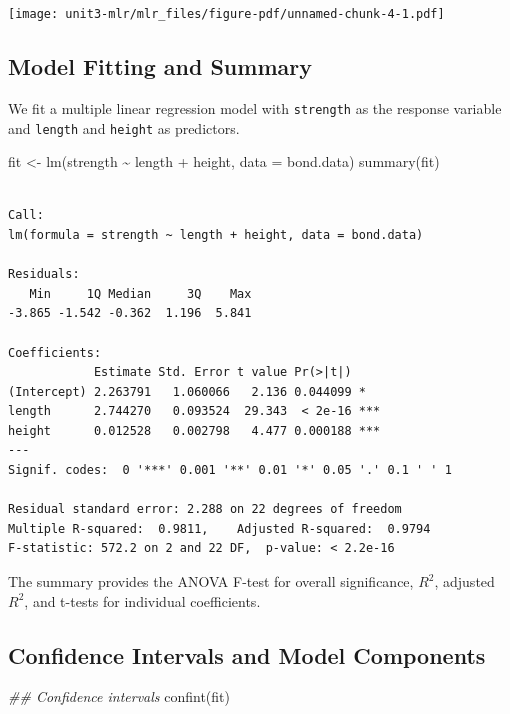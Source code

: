 \documentclass[
  letterpaper,
]{scrbook}
\newenvironment{Shaded}{\begin{snugshade}}{\end{snugshade}}
\newcommand{\AttributeTok}[1]{\textcolor[rgb]{0.40,0.45,0.13}{#1}}
\newcommand{\DocumentationTok}[1]{\textcolor[rgb]{0.37,0.37,0.37}{\textit{#1}}}
\newcommand{\FunctionTok}[1]{\textcolor[rgb]{0.28,0.35,0.67}{#1}}
\newcommand{\NormalTok}[1]{\textcolor[rgb]{0.00,0.23,0.31}{#1}}
\newcommand{\OtherTok}[1]{\textcolor[rgb]{0.00,0.23,0.31}{#1}}
\newcommand{\SpecialCharTok}[1]{\textcolor[rgb]{0.37,0.37,0.37}{#1}}
\begin{document}
\texttt{[image: unit3-mlr/mlr\_files/figure-pdf/unnamed-chunk-4-1.pdf]}

\subsection{Model Fitting and Summary}\label{model-fitting-and-summary}

We fit a multiple linear regression model with \texttt{strength} as the
response variable and \texttt{length} and \texttt{height} as predictors.

\begin{Shaded}
\begin{Highlighting}[]
\NormalTok{fit }\OtherTok{\textless{}{-}} \FunctionTok{lm}\NormalTok{(strength }\SpecialCharTok{\textasciitilde{}}\NormalTok{ length }\SpecialCharTok{+}\NormalTok{ height, }\AttributeTok{data =}\NormalTok{ bond.data)}
\FunctionTok{summary}\NormalTok{(fit)}
\end{Highlighting}
\end{Shaded}

\begin{verbatim}

Call:
lm(formula = strength ~ length + height, data = bond.data)

Residuals:
   Min     1Q Median     3Q    Max 
-3.865 -1.542 -0.362  1.196  5.841 

Coefficients:
            Estimate Std. Error t value Pr(>|t|)    
(Intercept) 2.263791   1.060066   2.136 0.044099 *  
length      2.744270   0.093524  29.343  < 2e-16 ***
height      0.012528   0.002798   4.477 0.000188 ***
---
Signif. codes:  0 '***' 0.001 '**' 0.01 '*' 0.05 '.' 0.1 ' ' 1

Residual standard error: 2.288 on 22 degrees of freedom
Multiple R-squared:  0.9811,    Adjusted R-squared:  0.9794 
F-statistic: 572.2 on 2 and 22 DF,  p-value: < 2.2e-16
\end{verbatim}

The summary provides the ANOVA F-test for overall significance, \(R^2\),
adjusted \(R^2\), and t-tests for individual coefficients.

\subsection{Confidence Intervals and Model
Components}\label{confidence-intervals-and-model-components}

\begin{Shaded}
\begin{Highlighting}[]
\DocumentationTok{\#\# Confidence intervals}
\FunctionTok{confint}\NormalTok{(fit)}
\end{Highlighting}
\end{Shaded}
\end{document}
